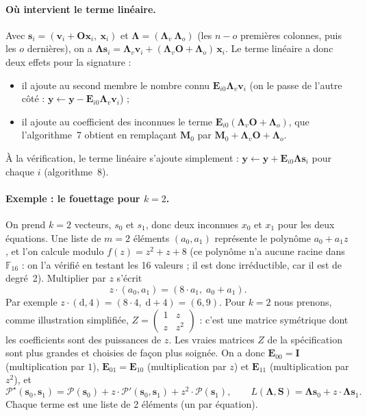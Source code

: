 \paragraph{Où intervient le terme linéaire.} Avec $\mathbf{s}_i=(\mathbf{v}_i+\mathbf{O}\mathbf{x}_i,\ \mathbf{x}_i)$ et $\boldsymbol{\Lambda}=(\boldsymbol{\Lambda}_v\ \boldsymbol{\Lambda}_o)$ (les $n-o$ premières colonnes, puis les $o$ dernières), on a $\boldsymbol{\Lambda}\mathbf{s}_i=\boldsymbol{\Lambda}_v\mathbf{v}_i+(\boldsymbol{\Lambda}_v\mathbf{O}+\boldsymbol{\Lambda}_o)\,\mathbf{x}_i$. Le terme linéaire a donc deux effets pour la signature :
\begin{itemize}[itemsep=1pt]
\item il ajoute au second membre le nombre connu $\mathbf{E}_{i0}\boldsymbol{\Lambda}_v\mathbf{v}_i$ (on le passe de l'autre côté : $\mathbf{y}\leftarrow\mathbf{y}-\mathbf{E}_{i0}\boldsymbol{\Lambda}_v\mathbf{v}_i$) ;
\item il ajoute au coefficient des inconnues le terme $\mathbf{E}_{i0}(\boldsymbol{\Lambda}_v\mathbf{O}+\boldsymbol{\Lambda}_o)$, que l'algorithme~7 obtient en remplaçant $\mathbf{M}_0$ par $\mathbf{M}_0+\boldsymbol{\Lambda}_v\mathbf{O}+\boldsymbol{\Lambda}_o$.
\end{itemize}
À la vérification, le terme linéaire s'ajoute simplement : $\mathbf{y}\leftarrow\mathbf{y}+\mathbf{E}_{i0}\boldsymbol{\Lambda}\mathbf{s}_i$ pour chaque $i$ (algorithme~8).

\paragraph{Exemple : le fouettage pour $k=2$.} On prend $k=2$ vecteurs, $s_0$ et $s_1$, donc deux inconnues $x_0$ et $x_1$ pour les deux équations. Une liste de $m=2$ éléments $(a_0,a_1)$ représente le polynôme $a_0+a_1z$, et l'on calcule modulo $f(z)=z^2+z+8$ (ce polynôme n'a aucune racine dans $\mathbb{F}_{16}$ : on l'a vérifié en testant les 16 valeurs ; il est donc irréductible, car il est de degré~2). Multiplier par $z$ s'écrit
\[z\cdot(a_0,a_1)=(8\cdot a_1,\;a_0+a_1).\]
Par exemple $z\cdot(\mathrm{d},4)=(8\cdot4,\;\mathrm{d}+4)=(6,9)$. Pour $k=2$ nous prenons, comme illustration simplifiée, $Z=\begin{pmatrix}1&z\\z&z^2\end{pmatrix}$ : c'est une matrice symétrique dont les coefficients sont des puissances de $z$. Les vraies matrices $Z$ de la spécification sont plus grandes et choisies de façon plus soignée. On a donc $\mathbf{E}_{00}=\mathbf{I}$ (multiplication par $1$), $\mathbf{E}_{01}=\mathbf{E}_{10}$ (multiplication par $z$) et $\mathbf{E}_{11}$ (multiplication par $z^2$), et
\[\mathcal{P}^\star(\mathbf{s}_0,\mathbf{s}_1)=\mathcal{P}(\mathbf{s}_0)+z\cdot\mathcal{P}'(\mathbf{s}_0,\mathbf{s}_1)+z^2\cdot\mathcal{P}(\mathbf{s}_1),\qquad L(\boldsymbol{\Lambda},\mathbf{S})=\boldsymbol{\Lambda}\mathbf{s}_0+z\cdot\boldsymbol{\Lambda}\mathbf{s}_1.\]
Chaque terme est une liste de 2 éléments (un par équation).

